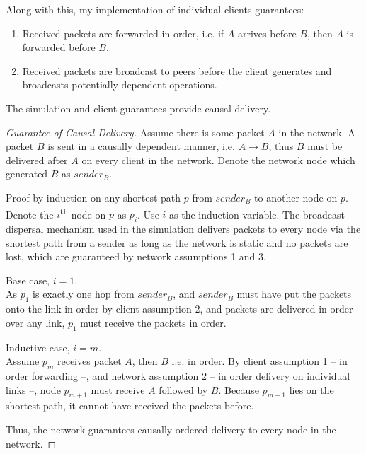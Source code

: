 \documentclass[12pt,a4paper,twoside,openright]{report}
\begin{document}
		Along with this, my implementation of individual clients guarantees:
		\begin{enumerate}
			\item Received packets are forwarded in order, i.e. if $A$ arrives before $B$, then $A$ is forwarded before $B$.
			\item Received packets are broadcast to peers before the client generates and broadcasts potentially dependent operations.
		\end{enumerate} 
		
		The simulation and client guarantees provide causal delivery.
		
		\begin{proof}[Guarantee of Causal Delivery]
		
		Assume there is some packet $A$ in the network. A packet $B$ is sent in a causally dependent manner, i.e. $A \rightarrow B$, thus $B$ must be delivered after $A$ on every client in the network. Denote the network node which generated $B$ as $sender_B$.
		
		Proof by induction on any shortest path $p$ from $sender_B$ to another node on $p$. Denote the $i$\textsuperscript{th} node on $p$ as $p_i$. Use $i$ as the induction variable. The broadcast dispersal mechanism used in the simulation delivers packets to every node via the shortest path from a sender as long as the network is static and no packets are lost, which are guaranteed by network assumptions 1 and 3.
		
		Base case, $i = 1$.\\
		As $p_1$ is exactly one hop from $sender_B$, and $sender_B$ must have put the packets onto the link in order by client assumption 2, and packets are delivered in order over any link, $p_1$ must receive the packets in order.
		
		Inductive case, $i = m$.\\
		Assume $p_m$ receives packet $A$, then $B$ i.e. in order. By client assumption 1 -- in order forwarding --, and network assumption 2 -- in order delivery on individual links --, node $p_{m+1}$ must receive $A$ followed by $B$. Because $p_{m+1}$ lies on the shortest path, it cannot have received the packets before.
		
		Thus, the network guarantees causally ordered delivery to every node in the network.
		
		
		

\end{proof}
\end{document}
